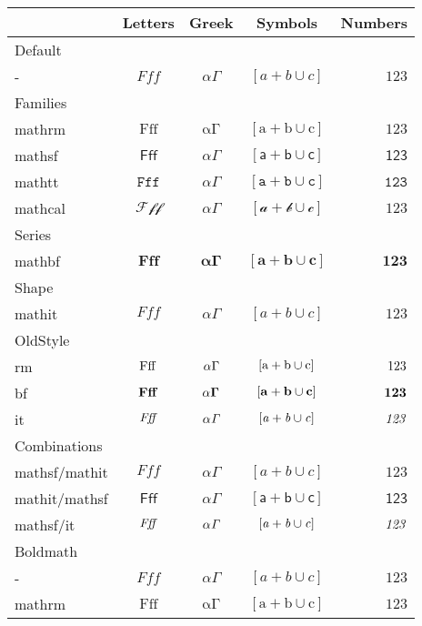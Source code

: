 \documentclass{article}
\def\ltrs{Fff}
\def\grk{\alpha \Gamma}
\def\sym{[a + b \cup c]}
\def\num{123}
\begin{document}
\begin{tabular}{lcccr}
      & Letters & Greek & Symbols & Numbers\\\hline
Default\\
 -     &  $\ltrs$ & $\grk$ & $\sym$ & $\num$ \\
\hline
Families \\
mathrm &  $\mathrm{\ltrs}$ & $\mathrm{\grk}$ & $\mathrm{\sym}$ & $\mathrm{\num}$ \\
mathsf &  $\mathsf{\ltrs}$ & $\mathsf{\grk}$ & $\mathsf{\sym}$ & $\mathsf{\num}$ \\
mathtt &  $\mathtt{\ltrs}$ & $\mathtt{\grk}$ & $\mathtt{\sym}$ & $\mathtt{\num}$ \\
mathcal &  $\mathcal{\ltrs}$ & $\mathcal{\grk}$ & $\mathcal{\sym}$ & $\mathcal{\num}$ \\
\hline
Series \\
mathbf    &  $\mathbf{\ltrs}$ & $\mathbf{\grk}$ & $\mathbf{\sym}$ & $\mathbf{\num}$ \\
\hline
Shape \\
mathit    &  $\mathit{\ltrs}$ & $\mathit{\grk}$ & $\mathit{\sym}$ & $\mathit{\num}$ \\
\hline
OldStyle \\
rm     &  $\rm \ltrs$ & $\rm \grk$ & $\rm \sym$ & $\rm \num$ \\
bf     &  $\bf \ltrs$ & $\bf \grk$ & $\bf \sym$ & $\bf \num$ \\
it     &  $\it \ltrs$ & $\it \grk$ & $\it \sym$ & $\it \num$ \\
\hline
Combinations\\
mathsf/mathit &  $\mathsf{\mathit{\ltrs}}$ & $\mathsf{\mathit{\grk}}$ & $\mathsf{\mathit{\sym}}$ & $\mathsf{\mathit{\num}}$ \\
mathit/mathsf &  $\mathit{\mathsf{\ltrs}}$ & $\mathit{\mathsf{\grk}}$ & $\mathit{\mathsf{\sym}}$ & $\mathit{\mathsf{\num}}$ \\
mathsf/it     &  $\mathsf{\it \ltrs}$ & $\mathsf{\it\grk}$ & $\mathsf{\it\sym}$ & $\mathsf{\it \num}$ \\
\hline
Boldmath\\
 -     &  {\boldmath $\ltrs$ } & {\boldmath  $\grk$ } & {\boldmath  $\sym$ } & {\boldmath  $\num$} \\
mathrm  & {\boldmath   $\mathrm{\ltrs}$ } & {\boldmath  $\mathrm{\grk}$ } & {\boldmath  $\mathrm{\sym}$ } & {\boldmath  $\mathrm{\num}$ }\\

\end{tabular}
\end{document}
